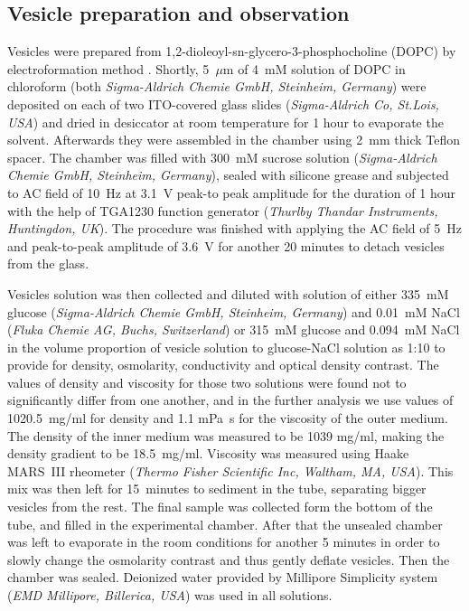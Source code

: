 \documentclass[10pt,a4paper,draft]{article}
\begin{document}
\subsection{Vesicle preparation and observation}
Vesicles were prepared from 1,2-dioleoyl-sn-glycero-3-phosphocholine \newline (DOPC) by electroformation method \cite{Angelova1986}.
Shortly, 5~$\mu$m of 4~mM solution of DOPC in chloroform (both \emph{Sigma-Aldrich Chemie GmbH, Steinheim, Germany}) were deposited on each of two ITO-covered glass slides (\emph{Sigma-Aldrich Co, St.Lois, USA}) and dried in desiccator at room temperature for 1 hour to evaporate the solvent.
Afterwards they were assembled in the chamber using 2~mm thick Teflon spacer.
The chamber was filled with 300~mM sucrose solution (\emph{Sigma-Aldrich Chemie GmbH, Steinheim, Germany}), sealed with silicone grease and subjected to AC field of 10~Hz at 3.1~V peak-to peak amplitude for the duration of 1 hour with the help of TGA1230 function generator (\emph{Thurlby Thandar Instruments, Huntingdon, UK}).
The procedure was finished with applying the AC field of 5~Hz and peak-to-peak amplitude of 3.6~V for another 20 minutes to detach vesicles from the glass.

Vesicles solution was then collected and diluted with solution of either 335~mM glucose (\emph{Sigma-Aldrich Chemie GmbH, Steinheim, Germany}) and 0.01~mM NaCl (\emph{Fluka Chemie AG, Buchs, Switzerland}) or 315~mM glucose and 0.094~mM NaCl in the volume proportion of vesicle solution to glucose-NaCl solution as 1:10 to provide for density, osmolarity, conductivity and optical density contrast.
The values of density and viscosity for those two solutions were found not to significantly differ from one another, and in the further analysis we use values of 1020.5~mg/ml for density and 1.1 mPa~s for the viscosity of the outer medium.
The density of the inner medium was measured to be 1039 mg/ml, making the density gradient to be 18.5~mg/ml. Viscosity was measured using Haake MARS~III rheometer (\emph{Thermo Fisher Scientific Inc, Waltham, MA, USA}).
This mix was then left for 15~minutes to sediment in the tube, separating bigger vesicles from the rest.
The final sample was collected form the bottom of the tube, and filled in the experimental chamber.
After that the unsealed chamber was left to evaporate in the room conditions for another 5 minutes in order to slowly change the osmolarity contrast and thus gently deflate vesicles.
Then the chamber was sealed.
Deionized water provided by Millipore Simplicity system (\emph{EMD Millipore, Billerica, USA}) was used in all solutions.
\end{document}
